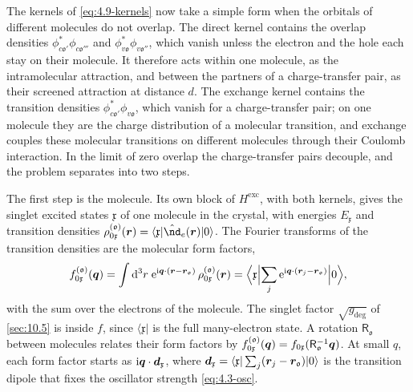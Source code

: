 The kernels of \cref{eq:4.9-kernels} now take a simple form when the orbitals of different molecules do not overlap. The direct kernel contains the overlap densities $\phi_{c\mathfrak{o}'}^*\phi_{c\mathfrak{o}'''}$ and $\phi_{v\mathfrak{o}}^*\phi_{v\mathfrak{o}''}$, which vanish unless the electron and the hole each stay on their molecule. It therefore acts within one molecule, as the intramolecular attraction, and between the partners of a charge-transfer pair, as their screened attraction at distance $d$. The exchange kernel contains the transition densities $\phi_{c\mathfrak{o}'}^*\phi_{v\mathfrak{o}}$, which vanish for a charge-transfer pair; on one molecule they are the charge distribution of a molecular transition, and exchange couples these molecular transitions on different molecules through their Coulomb interaction. In the limit of zero overlap the charge-transfer pairs decouple, and the problem separates into two steps.

The first step is the molecule. Its own block of $H^{\mathrm{exc}}$, with both kernels, gives the singlet excited states $\mathfrak{x}$ of one molecule in the crystal, with energies $E_{\mathfrak{x}}$ and transition densities $\rho^{(\mathfrak{o})}_{0\mathfrak{x}}(\vect{r}) = \langle\mathfrak{x}|\hat{\nd}_e(\vect{r})|0\rangle$. The Fourier transforms of the transition densities are the molecular form factors,
\begin{equation}
  f^{(\mathfrak{o})}_{0\mathfrak{x}}(\bm{q}) = \int\mathrm{d}^3r\;\mathrm{e}^{\mathrm{i}\bm{q}\cdot(\bm{r} - \bm{r}_{\mathfrak{o}})}\,\rho^{(\mathfrak{o})}_{0\mathfrak{x}}(\bm{r}) = \Bigl\langle\mathfrak{x}\Bigl|\sum_j\mathrm{e}^{\mathrm{i}\bm{q}\cdot(\bm{r}_j - \bm{r}_{\mathfrak{o}})}\Bigr|0\Bigr\rangle ,
  \label{eq:16.4-ff}
\end{equation}
with the sum over the electrons of the molecule. The singlet factor $\sqrt{g_{\mathrm{deg}}}$ of \cref{sec:10.5} is inside $f$, since $\langle\mathfrak{x}|$ is the full many-electron state. A rotation $\mathsf{R}_{\mathfrak{o}}$ between molecules relates their form factors by $f^{(\mathfrak{o})}_{0\mathfrak{x}}(\bm{q}) = f_{0\mathfrak{x}}(\mathsf{R}_{\mathfrak{o}}^{-1}\bm{q})$. At small $q$, each form factor starts as $\mathrm{i}\bm{q}\cdot\bm{d}_{\mathfrak{x}}$, where $\bm{d}_{\mathfrak{x}} = \langle\mathfrak{x}|\sum_j(\bm{r}_j - \bm{r}_{\mathfrak{o}})|0\rangle$ is the transition dipole that fixes the oscillator strength \cref{eq:4.3-osc}.

